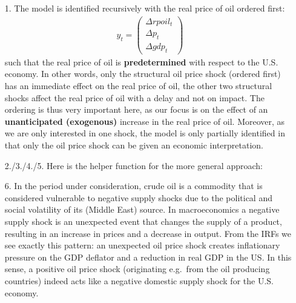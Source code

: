 \begin{enumerate}
\item[1.] The model is identified recursively with the real price of oil ordered first:
\begin{align*}
y_t = \begin{pmatrix}\Delta rpoil_t \\ \Delta p_t \\ \Delta gdp_t \end{pmatrix}
\end{align*}
such that the real price of oil is \textbf{predetermined} with respect to the U.S. economy.
In other words, only the structural oil price shock (ordered first) has an immediate effect on the real price of oil,
the other two structural shocks affect the real price of oil with a delay and not on impact.
The ordering is thus very important here,
as our focus is on the effect of an \textbf{unanticipated (exogenous)} increase in the real price of oil.
Moreover, as we are only interested in one shock,
the model is only partially identified in that only the oil price shock can be given an economic interpretation.

\item[2./3./4./5.]  
Here is the helper function for the more general approach:

\item[6.] In the period under consideration, crude oil is a commodity that is considered vulnerable to negative supply shocks
due to the political and social volatility of its (Middle East) source.
In macroeconomics a negative supply shock is an unexpected event that changes the supply of a product,
resulting in an increase in prices and a decrease in output.
From the IRFs we see exactly this pattern:
an unexpected oil price shock creates inflationary pressure on the GDP deflator and a reduction in real GDP in the US\@.
In this sense, a positive oil price shock (originating e.g.\ from the oil producing countries) indeed acts like a negative domestic supply shock for the U.S. economy.
\end{enumerate}
